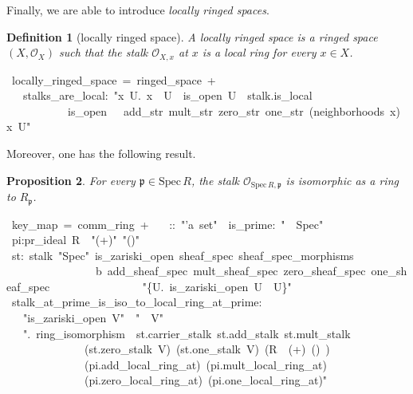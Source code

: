 \documentclass[12pt]{scrartcl}
\newtheorem{proposition}{Proposition}[section]
\newtheorem{definition}[proposition]{Definition}
\def\spec{\text{Spec}\,R}
\begin{document}
Finally, we are able to introduce \emph{locally ringed spaces}.

\begin{definition}[locally ringed space]
	A locally ringed space is a ringed space $(X, \mathscr{O}_X)$ such that the stalk $\mathscr{O}_{X, x}$ at $x$ is a local ring for every $x \in X$.
\end{definition}

\begin{isabelle}
\ locally\_ringed\_space\ =\ ringed\_space\ +\isanewline
\ \ \ stalks\_are\_local:\ "\isasymAnd x\ U.\ x\ \isasymin \ U\ \isasymLongrightarrow \ is\_open\ U\ \isasymLongrightarrow \ stalk.is\_local\ \isanewline
\ \ \ \ \ \ \ \ \ \ \ is\_open\ \isasymFF \ \isasymrho \ add\_str\ mult\_str\ zero\_str\ one\_str\ (neighborhoods\ x)\ x\ U"
\end{isabelle}

Moreover, one has the following result.

\begin{proposition}
	\label{prop:keyprop}
	For every $\mathfrak{p} \in \text{Spec}\,R$, the stalk $\mathscr{O}_{\spec, \mathfrak{p}}$ is isomorphic as a ring to $R_{\mathfrak{p}}$.	
\end{proposition}	

\begin{isabelle}
\ key\_map\ =\ comm\_ring\ +\isanewline
\ \ \ \isasympp ::\ "'a\ set"\ \ is\_prime:\ "\isasympp \ \isasymin \ Spec"\isanewline
{}\isanewline
\isanewline
{}\ pi:pr\_ideal\ R\ \isasympp \ "(+)"\ "(\isasymcdot )"\ \isasymzero \ \isasymone 
\isanewline
\isanewline
{}\ st:\ stalk\ "Spec"\ is\_zariski\_open\ sheaf\_spec\ sheaf\_spec\_morphisms\isanewline
\ \ \ \ \ \ \ \ \ \ \ \ \ \ \ \ \isasymO b\ add\_sheaf\_spec\ mult\_sheaf\_spec\ zero\_sheaf\_spec\ one\_sheaf\_spec\isanewline
\ \ \ \ \ \ \ \ \ \ \ \ \ \ \ \ "\{U.\ is\_zariski\_open\ U\ \isasymand \ \isasympp \isasymin U\}"\ \isasympp \isanewline
\isanewline
{}\ stalk\_at\_prime\_is\_iso\_to\_local\_ring\_at\_prime:\isanewline
\ \ \ "is\_zariski\_open\ V"\ \ "\isasympp \ \isasymin \ V"\isanewline
\ \ \ "\isasymexists \isasymphi .\ ring\_isomorphism\ \isasymphi \ st.carrier\_stalk\ st.add\_stalk\ st.mult\_stalk\ \isanewline
\ \ \ \ \ \ \ \ \ \ \ \ \ \ (st.zero\_stalk\ V)\ (st.one\_stalk\ V)\ (R\ \isactrlbsub \isasympp \ (+)\ (\isasymcdot )\ \isasymzero \isactrlesub )\ \isanewline
\ \ \ \ \ \ \ \ \ \ \ \ \ \ (pi.add\_local\_ring\_at)\ (pi.mult\_local\_ring\_at)\ \isanewline
\ \ \ \ \ \ \ \ \ \ \ \ \ \ (pi.zero\_local\_ring\_at)\ (pi.one\_local\_ring\_at)"\isanewline
\isanewline
{}
\end{isabelle}
\end{document}
